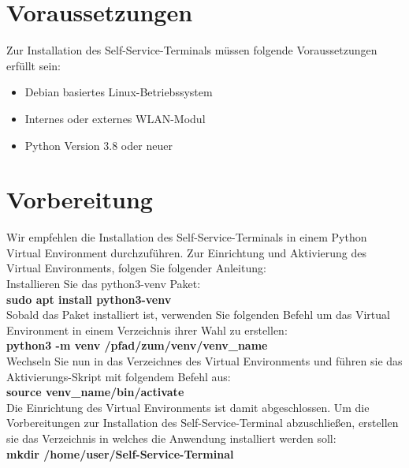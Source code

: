 \section{Voraussetzungen}
Zur Installation des Self-Service-Terminals müssen folgende Voraussetzungen erfüllt sein:
\begin{itemize}
    \item Debian basiertes Linux-Betriebssystem
    \item Internes oder externes WLAN-Modul
    \item Python Version 3.8 oder neuer
\end{itemize}

\section{Vorbereitung}
Wir empfehlen die Installation des Self-Service-Terminals in einem Python Virtual Environment durchzuführen. Zur Einrichtung und Aktivierung des Virtual Environments, folgen Sie folgender Anleitung:\\

\noindent Installieren Sie das python3-venv Paket:\\

\textbf{sudo apt install python3-venv}\\

\noindent Sobald das Paket installiert ist, verwenden Sie folgenden Befehl um das Virtual Environment in einem Verzeichnis ihrer Wahl zu erstellen:\\

\textbf{python3 -m venv /pfad/zum/venv/venv\_name}\\

\noindent Wechseln Sie nun in das Verzeichnes des Virtual Environments und führen sie das Aktivierungs-Skript mit folgendem Befehl aus:\\

\textbf{source venv\_name/bin/activate}\\

Die Einrichtung des Virtual Environments ist damit abgeschlossen.
Um die Vorbereitungen zur Installation des Self-Service-Terminal abzuschließen, erstellen sie das Verzeichnis in welches die Anwendung installiert werden soll:\\

\textbf{mkdir /home/{user}/Self-Service-Terminal}\\



